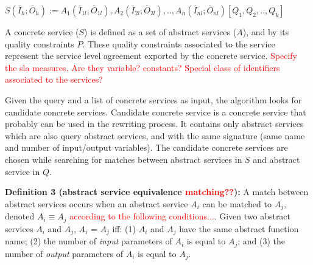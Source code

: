 \begin{center}

\begin{math}
S (\overline{I}_{h}; \overline{O}_{h}) := A_{1}(\overline{I}_{1l}; \overline{O}_{1l}), A_{2}(\overline{I}_{2l}; \overline{O}_{2l}), ..,  A_{n}(\overline{I}_{nl}; \overline{O}_{nl})[Q_{1},Q_{2}, .., Q_{k}]
\end{math}

\end{center} 

A concrete service ($S$) is defined as a set of abstract services ($A$), and by its quality constraints $P$. 
These quality constraints associated to the service represent the service level agreement exported by the concrete service. \textcolor{red}{Specify the sla measures. Are they variable? constants? Special class of identifiers associated to the services?}



Given the query and a list of concrete services as input, the algorithm looks for candidate concrete services. 
Candidate concrete service is a concrete service that probably can be used in the rewriting process. 
It contains only abstract services which are also query abstract services, and with the same signature (same name and number of input/output variables).
The candidate concrete services are chosen while searching for matches between abstract services in $S$ and abstract service in $Q$. 

\noindent \textbf{Definition 3 (abstract service equivalence \textcolor{red}{matching??}):} 
A match between abstract services occurs when an abstract service $A_{i}$ can be matched to $A_{j}$, denoted $A_{i} \equiv A_{j}$ \textcolor{red}{according to the following conditions...}. 
Given two abstract services $A_{i}$ and $A_{j}$, $A_{i}$ = $A_{j}$ iff: (1) $A_{i}$ and $A_{j}$ have the same abstract function name; (2) the number of \textit{input} parameters of $A_{i}$ is equal to $A_{j}$; and (3) the number of \textit{output} parameters of $A_{i}$ is equal to $A_{j}$. 



